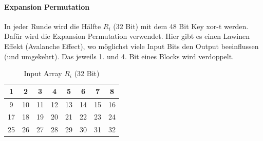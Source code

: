 \paragraph{Expansion Permutation}

In jeder Runde wird die Hälfte $R_i$ (32 Bit) mit dem 48 Bit Key xor-t werden. Dafür wird die Expansion Permutation  verwendet. Hier gibt
es einen Lawinen Effekt (Avalanche Effect), wo möglichst viele Input Bits den Output beeinflussen (und umgekehrt). Das jeweils 1. und 4. Bit eines Blocks wird verdoppelt.

\begin{table}[h]
    \centering
    \begin{tabular}{|*{8}{c|}}
        \hline
        \cellcolor{red-1}1 & \cellcolor{red-1}2 & \cellcolor{red-1}3 & \cellcolor{red-1}4 & 
        \cellcolor{red-1}5 & \cellcolor{red-1}6 & \cellcolor{red-1}7 & \cellcolor{red-1}8 \\
        \hline 
        \cellcolor{orange-1}9 & \cellcolor{orange-1}10 & \cellcolor{orange-1}11 & \cellcolor{orange-1}12 & 
        \cellcolor{orange-1}13 & \cellcolor{orange-1}14 & \cellcolor{orange-1}15 & \cellcolor{orange-1}16 \\
        \hline 
        \cellcolor{yellow-1}17 & \cellcolor{yellow-1}18 & \cellcolor{yellow-1}19 & \cellcolor{yellow-1}20 & 
        \cellcolor{yellow-1}21 & \cellcolor{yellow-1}22 & \cellcolor{yellow-1}23 & \cellcolor{yellow-1}24 \\
        \hline
        \cellcolor{green-1}25 & \cellcolor{green-1}26 & \cellcolor{green-1}27 & \cellcolor{green-1}28 &
        \cellcolor{green-1}29 & \cellcolor{green-1}30 & \cellcolor{green-1}31 & \cellcolor{green-1}32 \\
        \hline 
    \end{tabular}
    \caption{Input Array $R_i$ (32 Bit)}
\end{table}

